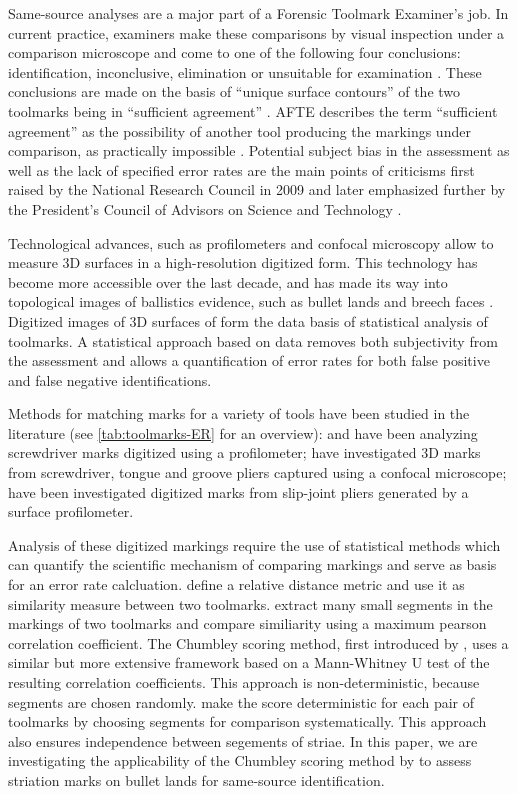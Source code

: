 \documentclass[12pt]{article}
\begin{document}
Same-source analyses are a major part of a Forensic Toolmark Examiner's
job. In current practice, examiners make these comparisons by visual
inspection under a comparison microscope and come to one of the
following four conclusions: identification, inconclusive, elimination or
unsuitable for examination \citep{afte-toolmarks1998}. These conclusions
are made on the basis of ``unique surface contours'' of the two
toolmarks being in ``sufficient agreement'' \citep{afte-toolmarks1998}.
AFTE describes the term ``sufficient agreement'' as the possibility of
another tool producing the markings under comparison, as practically
impossible \citep{afte-toolmarks1998}. Potential subject bias in the
assessment as well as the lack of specified error rates are the main
points of criticisms first raised by the National Research Council in
2009 \citep{NAS:2009} and later emphasized further by the President's
Council of Advisors on Science and Technology \citep{pcast2016}.

Technological advances, such as profilometers and confocal microscopy
allow to measure 3D surfaces in a high-resolution digitized form. This
technology has become more accessible over the last decade, and has made
its way into topological images of ballistics evidence, such as bullet
lands and breech faces
\citep{DeKinder1, DeKinder2, Bachrach1, vorburger2016}. Digitized images
of 3D surfaces of form the data basis of statistical analysis of
toolmarks. A statistical approach based on data removes both
subjectivity from the assessment and allows a quantification of error
rates for both false positive and false negative identifications.

Methods for matching marks for a variety of tools have been studied in
the literature (see \autoref{tab:toolmarks-ER} for an overview):
\citet{manytoolmarks1} and \citet{chumbley} have been analyzing
screwdriver marks digitized using a profilometer; \citet{manytoolmarks2}
have investigated 3D marks from screwdriver, tongue and groove pliers
captured using a confocal microscope; \citet{afte-chumbley} have been
investigated digitized marks from slip-joint pliers generated by a
surface profilometer.

Analysis of these digitized markings require the use of statistical
methods which can quantify the scientific mechanism of comparing
markings and serve as basis for an error rate calcluation.
\citet{manytoolmarks2} define a relative distance metric and use it as
similarity measure between two toolmarks. \citet{manytoolmarks1} extract
many small segments in the markings of two toolmarks and compare
similiarity using a maximum pearson correlation coefficient. The
Chumbley scoring method, first introduced by \citet{chumbley}, uses a
similar but more extensive framework based on a Mann-Whitney U test of
the resulting correlation coefficients. This approach is
non-deterministic, because segments are chosen randomly. \citep{hadler}
make the score deterministic for each pair of toolmarks by choosing
segments for comparison systematically. This approach also ensures
independence between segements of striae. In this paper, we are
investigating the applicability of the Chumbley scoring method by
\citet{hadler} to assess striation marks on bullet lands for same-source
identification.
\end{document}
